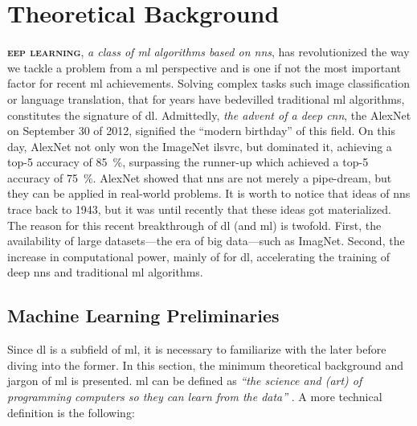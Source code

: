 \chapter{Theoretical Background}

\lettrine[
	nindent=0em, findent=0.5em, loversize=-0.12, lines=5
]{}{\bfseries\color{Blue}eep learning},
\emph{a class of \gls{ml} algorithms based on
\glspl{nn}}, has revolutionized the way we tackle a problem from a \gls{ml}
perspective and is one if not the most important factor for recent \gls{ml}
achievements. Solving complex tasks such image classification or language translation, that for
years have bedevilled traditional \gls{ml} algorithms, constitutes the signature
of \gls{dl}. Admittedly, \emph{the advent of a deep
\gls{cnn}}, the AlexNet \parencite{alexnet}
on September 30 of 2012, signified the ``modern birthday'' of this field. On
this day, AlexNet not only won the ImageNet \parencite{Deng_2009}
\gls{ilsvrc}, but dominated it, achieving a top-5 accuracy
of \SI{85}{\percent}, surpassing the runner-up which achieved a top-5 accuracy
of \SI{75}{\percent}.  AlexNet showed that \glspl{nn} are not merely a
pipe-dream, but they can be applied in real-world problems. It is worth to
notice that ideas of \glspl{nn} trace back to 1943, but it was until recently
that these ideas got materialized. The reason for this recent breakthrough of
\gls{dl} (and \gls{ml}) is twofold. First, the availability of large
datasets---the era of big data---such as
ImagNet. Second, the increase in computational power, mainly of
 for \gls{dl}, accelerating the training of deep \glspl{nn} and
traditional \gls{ml} algorithms.

\section{Machine Learning Preliminaries}

Since \gls{dl} is a subfield of \gls{ml}, it is necessary to familiarize with
the later before diving into the former. In this section, the minimum
theoretical background and jargon of \gls{ml} is presented. \Acrlong{ml} can be
defined as \emph{``the science and (art) of programming computers so they can
learn from the data''} \parencite{ml}. A more technical definition is the following:

